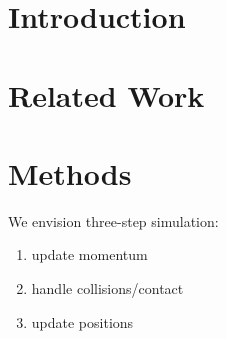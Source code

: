 \documentclass[review]{acmsiggraph-job}
\begin{document}
\newcommand{\figureWideTop}[1]{
  \begin{figure*}[!t]{\sloppy #1}\end{figure*}
}

\newcommand{\eqAlgn}{\!\!&\!\!}

\newcommand{\Eref}[1]{Equation~(\ref{#1})}
\newcommand{\Erefs}[2]{Equations~(\ref{#1}) and (\ref{#2})}
\newcommand{\eref}[1]{Equation~(\ref{#1})}
\newcommand{\erefs}[2]{Equations~(\ref{#1}) and (\ref{#2})}
\newcommand{\Sref}[1]{Section~\ref{#1}}
\newcommand{\sref}[1]{Section~\ref{#1}}
\newcommand{\fref}[1]{Figure~\ref{#1}}
\newcommand{\frefAND}[2]{Figures~\ref{#1} and~\ref{#2}}
\newcommand{\frefs}[2]{Figures~\ref{#1} and~\ref{#2}}
\newcommand{\frefss}[3]{Figures~\ref{#1}, \ref{#2}, and~\ref{#3}}
\newcommand{\frefsss}[4]{Figures~\ref{#1}, \ref{#2}, \ref{#3}, and~\ref{#4}}
\newcommand{\Fref}[1]{Figure~\ref{#1}}
\newcommand{\Frefs}[2]{Figures~\ref{#1} and~\ref{#2}}
\newcommand{\Frefss}[3]{Figures~\ref{#1}, \ref{#2}, and~\ref{#3}}
\newcommand{\Frefsss}[4]{Figures~\ref{#1}, \ref{#2}, \ref{#3}, and~\ref{#4}}
\newcommand{\tref}[1]{Table~\ref{#1}}

\renewcommand{\labelenumi}{\arabic{enumi}.}
\renewcommand{\labelenumii}{\alph{enumii}.}
\renewcommand{\labelenumiii}{\roman{enumiii}.}

\newenvironment{algstep}{%
  \begin{enumerate}%
    \setlength{\itemsep}{0in}%
    \setlength{\partopsep}{0in}%
    \setlength{\topsep}{0in}%
}{\end{enumerate}}


\section{Introduction}\label{sec:Introduction}
\copyrightspace

\section{Related Work}\label{sec:RelatedWork}

\section{Methods}
We envision three-step simulation:
\begin{enumerate}
\item update momentum
\item handle collisions/contact
\item update positions
\end{enumerate}
\end{document}
